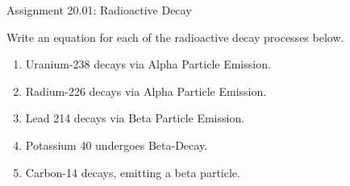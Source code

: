 \documentclass[letterpaper, 12pt]{article}
\begin{document}


\begin{center} Assignment 20.01: Radioactive Decay
\end{center}



Write an equation for each of the radioactive decay processes below. 

\begin{enumerate}

\item Uranium-238 decays via Alpha Particle Emission.
\vspace{1in}

\item Radium-226 decays via Alpha Particle Emission.

\vspace{1in}
\item Lead 214 decays via Beta Particle Emission.

\vspace{1in}
\item Potassium 40 undergoes Beta-Decay.

\vspace{1in}

\item Carbon-14 decays, emitting a beta particle.  



	
\end{enumerate}
 
\end{document}
